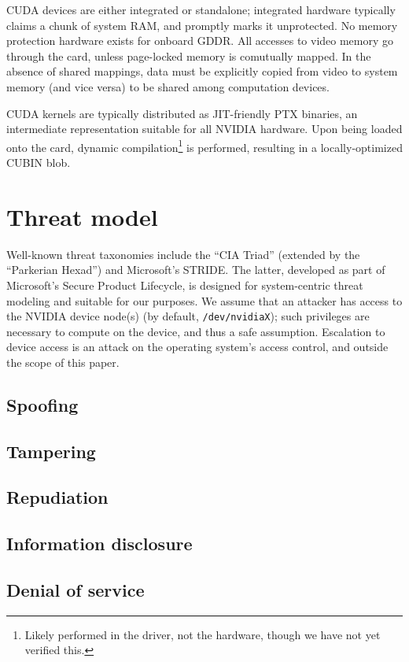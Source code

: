 \documentclass[letterpaper,10pt]{article}
\begin{document}
\begin{multicols}{2}
CUDA devices are either integrated or standalone; integrated hardware typically
claims a chunk of system RAM, and promptly marks it unprotected. No memory
protection hardware exists for onboard GDDR. All accesses to video memory go
through the card, unless page-locked memory is comutually mapped. In the
absence of shared mappings, data must be explicitly copied from video to system
memory (and vice versa) to be shared among computation devices\cite{cudaguide}.

CUDA kernels are typically distributed as JIT-friendly PTX binaries\cite{kerr},
an intermediate representation suitable for all NVIDIA hardware. Upon being
loaded onto the card, dynamic compilation\footnote{Likely performed in the
driver, not the hardware, though we have not yet verified this.} is performed,
resulting in a locally-optimized CUBIN blob.

\section{Threat model}
Well-known threat taxonomies include the ``CIA Triad'' (extended by the
``Parkerian Hexad\cite{sechandbook}'') and Microsoft's STRIDE. The latter, developed as part of
Microsoft's Secure Product Lifecycle, is designed for system-centric threat
modeling and suitable for our purposes. We assume that an attacker has access
to the NVIDIA device node(s) (by default, \texttt{/dev/nvidiaX}); such privileges
are necessary to compute on the device, and thus a safe assumption. Escalation
to device access is an attack on the operating system's access control, and
outside the scope of this paper.



\subsection{Spoofing}
\subsection{Tampering}
\subsection{Repudiation}
\subsection{Information disclosure}
\subsection{Denial of service}

\end{multicols}
\end{document}
